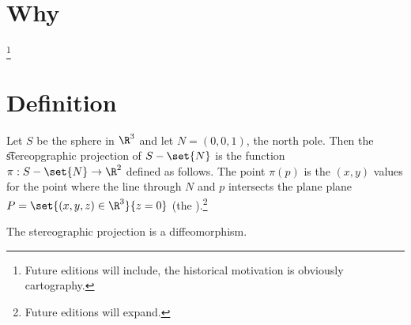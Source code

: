 

\section*{Why}
\footnote{Future editions will include, the historical motivation is obviously cartography.}
\section*{Definition}

Let $S$ be the sphere in $\R ^3$ and let $N = (0, 0, 1)$, the north pole.
Then the \t{stereopgraphic projection} of $S - \set{N}$ is the function $\pi : S - \set{N} \to \R ^2$ defined as follows.
The point $\pi (p)$ is the $(x, y)$ values for the point where the line through $N$ and $p$ intersects the plane plane $P = \set{(x, y, z) \in \R ^3}{z = 0}$ (the ).\footnote{Future editions will expand.}

\begin{proposition}
The stereographic projection is a diffeomorphism.\end{proposition}
\blankpage